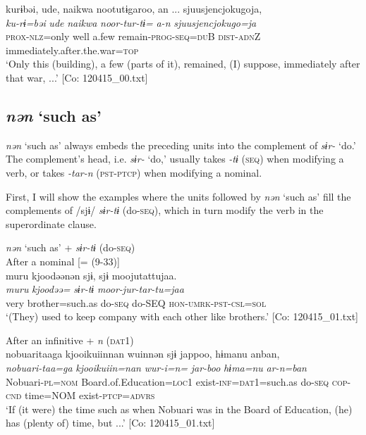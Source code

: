   \ex  %
      \glll    kurɨbəi,  ude,  naikwa  nootutɨgaroo,  an ...  {\textbar}sjuusjencjokugo{\textbar}ja,\\
      \textit{ku-rɨ=bəi}  \textit{ude}  \textit{naikwa}  \textit{noor-tur-tɨ=}  \textit{a-n}  \textit{sjuusjencjokugo=ja}  \\
      \textsc{prox}-\textsc{nlz}=only  well  a.few  remain-\textsc{prog}-\textsc{seq}=\textsc{du}B  \textsc{dist}-\textsc{adn}Z  immediately.after.the.war=\textsc{top}        \\
      \glt       ‘Only this (building), a few (parts of it), remained, (I) suppose, immediately after that war, ...’ [Co: 120415\_00.txt]
    \z
\z

\subsection{\textit{nən} ‘such as’}\label{sec:10.4.4}

\textit{nən} ‘such as’ always embeds the preceding units into the complement of \textit{sɨr-} ‘do.’ The complement’s head, i.e. \textit{sɨr-} ‘do,’ usually takes \textit{{}-tɨ} (\textsc{seq}) when modifying a verb, or takes \textit{-tar-n} (\textsc{pst}-\textsc{ptcp}) when modifying a nominal.

  First, I will show the examples where the units followed by \textit{nən} ‘such as’ fill the complements of /sjɨ/ \textit{sɨr-tɨ} (do-\textsc{seq}), which in turn modify the verb in the superordinate clause.

\ea\label{ex:10.85}   \textit{nən} ‘such as’ + \textit{sɨr-tɨ} (do-\textsc{seq})\\
  \ea After a nominal [= (9-33)]\\
      \glll    muru  kjoodəənən  sjɨ,  sjɨ  moojutattujaa.\\
    \textit{muru}  \textit{kjoodəə=}  \textit{}  \textit{sɨr-tɨ}  \textit{moor-jur-tar-tu=jaa}\\
    very  brother=such.as  do-\textsc{seq}  do-SEQ  \textsc{hon}-\textsc{umrk}-\textsc{pst}-\textsc{csl}=\textsc{sol}\\
\glt     ‘(They) used to keep company with each other like brothers.’  [Co: 120415\_01.txt]

  \ex After an infinitive + \textit{n} (\textsc{dat}1)\\
      \glll    nobuaritaaga  {\textbar}kjooikuiin{\textbar}nan  wuinnən  sjɨ  jappoo,  hɨmanu  anban,\\
    \textit{nobuari-taa=ga}  \textit{kjooikuiin=nan}  \textit{wur-i=n=}  \textit{}  \textit{jar-boo}  \textit{hɨma=nu}  \textit{ar-n=ban}\\
    Nobuari-\textsc{pl}=\textsc{nom}  Board.of.Education=\textsc{loc}1  exist-\textsc{inf}=\textsc{dat}1=such.as  do-\textsc{seq}  \textsc{cop}-\textsc{cnd}  time=NOM  exist-\textsc{ptcp}=\textsc{advrs}\\
\glt     ‘If (it were) the time such as when Nobuari was in the Board of Education, (he) has (plenty of) time, but ...’  [Co: 120415\_01.txt]

